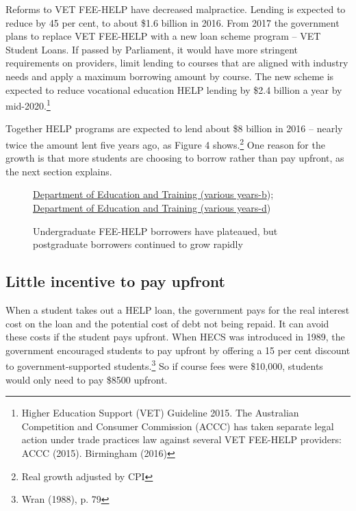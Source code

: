 \documentclass[embargoed]{grattan}
\begin{document}
Reforms to VET FEE-HELP have decreased malpractice. Lending is expected to reduce by 45 per cent, to about \$1.6 billion in 2016. From 2017 the government plans to replace VET FEE-HELP with a new loan scheme program -- VET Student Loans. If passed by Parliament, it would have more stringent requirements on providers, limit lending to courses that are aligned with industry needs and apply a maximum borrowing amount by course. The new scheme is expected to reduce vocational education HELP lending by \$2.4 billion a year by mid-2020.\footnote{Higher Education Support (VET) Guideline 2015. The Australian Competition and Consumer Commission (ACCC) has taken separate legal action under trade practices law against several VET FEE-HELP providers: ACCC (2015). Birmingham (2016)}

Together HELP programs are expected to lend about \$8 billion in 2016 -- nearly twice the amount lent five years ago, as Figure 4 shows.\footnote{Real growth adjusted by CPI} One reason for the growth is that more students are choosing to borrow rather than pay upfront, as the next section explains.

\begin{figure}
\caption{Undergraduate FEE-HELP borrowers have plateaued, but postgraduate borrowers continued to grow rapidly}\label{fig:fig5-undergrad-HELP-borrowers-have-plateaued-but-postgrad-borrowers-continued-to-grow-rapidly}

%
{\protect\hyperlink{_ENREF_36}{Department of Education and Training (various years-b}); \protect\hyperlink{_ENREF_38}{Department of Education and Training (various years-d})}
\end{figure}

\subsection{\texorpdfstring{\protect\hypertarget{_Ref333152519}{}{\protect\hypertarget{_Ref335384889}{}{\protect\hypertarget{_Ref333848257}{}{}}}Little incentive to pay upfront }{Little incentive to pay upfront }}\label{little-incentive-to-pay-upfront}

When a student takes out a HELP loan, the government pays for the real interest cost on the loan and the potential cost of debt not being repaid. It can avoid these costs if the student pays upfront. When HECS was introduced in 1989, the government encouraged students to pay upfront by offering a 15 per cent discount to government-supported students.\footnote{Wran (1988), p. 79} So if course fees were \$10,000, students would only need to pay \$8500 upfront.
\end{document}
